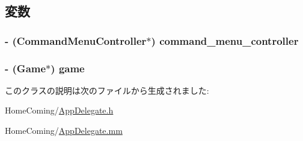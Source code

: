\subsection{変数}
\hypertarget{interface_app_delegate_a63ca0325e79450fd36de6381349d6a7f}{
\subsubsection[{command\-\_\-menu\-\_\-controller}]{\setlength{\rightskip}{0pt plus 5cm}-\/ ({\bf Command\-Menu\-Controller}$\ast$) {\bf command\-\_\-menu\-\_\-controller}}}\label{interface_app_delegate_a63ca0325e79450fd36de6381349d6a7f}
\hypertarget{interface_app_delegate_a4f90e50bfc6e8e02332eb2734de1e93f}{
\subsubsection[{game}]{\setlength{\rightskip}{0pt plus 5cm}-\/ ({\bf Game}$\ast$) {\bf game}}}\label{interface_app_delegate_a4f90e50bfc6e8e02332eb2734de1e93f}


このクラスの説明は次のファイルから生成されました\-:\begin{DoxyCompactItemize}
\item 
Home\-Coming/\hyperlink{_app_delegate_8h}{App\-Delegate.\-h}\item 
Home\-Coming/\hyperlink{_app_delegate_8mm}{App\-Delegate.\-mm}\end{DoxyCompactItemize}
